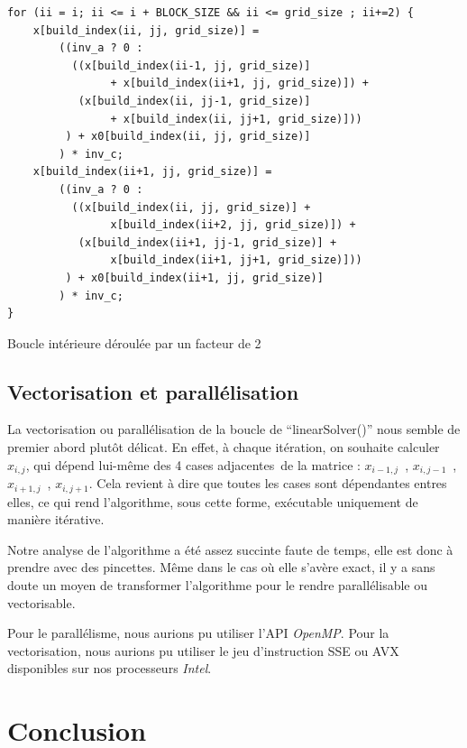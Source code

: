 \documentclass[12pt,a4paper]{article}
\begin{document}
\begin{listing}
    \begin{verbatim}
for (ii = i; ii <= i + BLOCK_SIZE && ii <= grid_size ; ii+=2) {
    x[build_index(ii, jj, grid_size)] = 
        ((inv_a ? 0 :
          ((x[build_index(ii-1, jj, grid_size)]
                + x[build_index(ii+1, jj, grid_size)]) +
           (x[build_index(ii, jj-1, grid_size)]
                + x[build_index(ii, jj+1, grid_size)]))
         ) + x0[build_index(ii, jj, grid_size)]
        ) * inv_c;
    x[build_index(ii+1, jj, grid_size)] = 
        ((inv_a ? 0 :
          ((x[build_index(ii, jj, grid_size)] + 
                x[build_index(ii+2, jj, grid_size)]) +
           (x[build_index(ii+1, jj-1, grid_size)] +
                x[build_index(ii+1, jj+1, grid_size)]))
         ) + x0[build_index(ii+1, jj, grid_size)]
        ) * inv_c;
}
    \end{verbatim}
    \caption{Boucle intérieure déroulée par un facteur de 2}
    \label{lst.optim.unrol}
\end{listing}

\subsection{Vectorisation et parallélisation}
\label{sub.optim.vec}

La vectorisation ou parallélisation de la boucle de \enquote{linearSolver()}
nous semble de premier abord plutôt délicat. En effet, à chaque itération, on
souhaite calculer $x_{i,j}$, qui dépend lui-même des 4 cases adjacentes de la
matrice : $x_{i-1,j}$ , $x_{i,j-1}$ , $x_{i+1,j}$ , $x_{i,j+1}$. Cela revient à
dire que toutes les cases sont dépendantes entres elles, ce qui rend
l'algorithme, sous cette forme, exécutable uniquement de manière itérative.

Notre analyse de l'algorithme a été assez succinte faute de temps, elle est donc
à prendre avec des pincettes. Même dans le cas où elle s'avère exact, il y a
sans doute un moyen de transformer l'algorithme pour le rendre parallélisable ou
vectorisable.

Pour le parallélisme, nous aurions pu utiliser l'API \textit{OpenMP}. Pour la
vectorisation, nous aurions pu utiliser le jeu d'instruction \acs{SSE} ou
\acs{AVX} disponibles sur nos processeurs \textit{Intel}.

\section{Conclusion}
\label{sec.conc}
\end{document}
